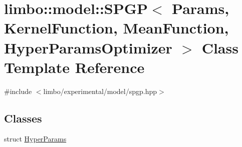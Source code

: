 \hypertarget{classlimbo_1_1model_1_1_s_p_g_p}{}\section{limbo\+:\+:model\+:\+:S\+P\+G\+P$<$ Params, Kernel\+Function, Mean\+Function, Hyper\+Params\+Optimizer $>$ Class Template Reference}
\label{classlimbo_1_1model_1_1_s_p_g_p}


{\ttfamily \#include $<$limbo/experimental/model/spgp.\+hpp$>$}

\subsection*{Classes}
\begin{DoxyCompactItemize}
\item 
struct \hyperlink{structlimbo_1_1model_1_1_s_p_g_p_1_1_hyper_params}{Hyper\+Params}
\end{DoxyCompactItemize}
